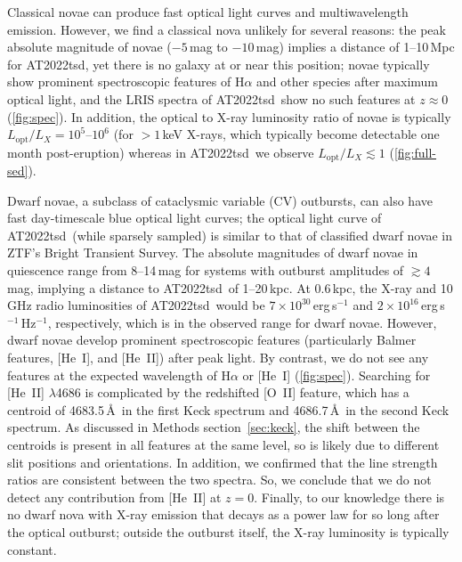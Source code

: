 \documentclass{nature_plusfigure}
\newcommand{\at}{AT2022tsd}
\begin{document}
\begin{methods}
Classical novae can produce fast optical light curves and multiwavelength emission\cite{Chomiuk2021}. However, we find a classical nova unlikely for several reasons: the peak absolute magnitude of novae ($-5\,$mag to $-10\,$mag\cite{Chomiuk2021}) implies a distance of 1--10\,Mpc for \at, yet there is no galaxy at or near this position; novae typically show prominent spectroscopic features of H$\alpha$ and other species after maximum optical light\cite{Chomiuk2021}, and the LRIS spectra of \at\ show no such features at $z\approx0$ (\ref{fig:spec}). In addition, the optical to X-ray luminosity ratio of novae is typically $L_\mathrm{opt}/L_X=10^{5}$--$10^{6}$ (for $>1\,$keV X-rays, which typically become detectable one month post-eruption\cite{Chomiuk2021}) whereas in \at\ we observe $L_\mathrm{opt}/L_X\lesssim1$ (\ref{fig:full-sed}).

Dwarf novae, a subclass of cataclysmic variable (CV) outbursts, can also have fast day-timescale blue optical light curves; the optical light curve of \at\ (while sparsely sampled) is similar to that of classified dwarf novae in ZTF's Bright Transient Survey\cite{PerleyBTS}. The absolute magnitudes of dwarf novae in quiescence range from 8--14\,mag for systems with outburst amplitudes of $\gtrsim4\,$mag\cite{Szkody2021}, implying a distance to \at\ of 1--20\,kpc. At 0.6\,kpc, the X-ray and 10\,GHz radio luminosities of \at\ would be $7\times10^{30}\,$erg\,s$^{-1}$ and $2\times10^{16}$\,erg\,s$^{-1}$\,Hz$^{-1}$, respectively, which is in the observed range for dwarf novae\cite{Polzin2022,Coppejans2020_CV}. 
However, dwarf novae develop prominent spectroscopic features (particularly Balmer features, [He~I], and [He~II]) after peak light\cite{Morales-Rueda2002,Han2020}. By contrast, we do not see any features at the expected wavelength of H$\alpha$ or [He~I] (\ref{fig:spec}). Searching for [He~II] $\lambda$4686 is complicated by the redshifted [O~II] feature, which has a centroid of 4683.5\,\AA\ in the first Keck spectrum and 4686.7\,\AA\ in the second Keck spectrum. 
As discussed in Methods section~\ref{sec:keck}, the shift between the centroids is present in all features at the same level, so is likely due to different slit positions and orientations. In addition, we confirmed that the line strength ratios are consistent between the two spectra. So, we conclude that we do not detect any contribution from [He~II] at $z=0$.
Finally, to our knowledge there is no dwarf nova with X-ray emission that decays as a power law for so long after the optical outburst; outside the outburst itself, the X-ray luminosity is typically constant\cite{Fertig2011}.


\end{methods}
\end{document}
